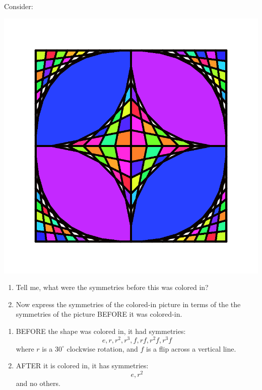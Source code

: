 \documentclass[noauthor,nooutcomes,12pt,hints]{ximera}
\begin{document}
\begin{question}
 Consider:
 \begin{center}
  \includegraphics[width=.6\textwidth]{qR2D4.png}
 \end{center}
 \begin{enumerate}
 \item Tell me, what were the symmetries before this was colored in?
 \item Now express the symmetries of the colored-in picture in terms
    of the the symmetries of the picture BEFORE it was colored-in.
 \end{enumerate}
  \begin{freeResponse}
    \begin{enumerate}
    \item BEFORE the shape was colored in, it had symmetries:
      \[
      e,r,r^2,r^3, f, rf,r^2f,r^3f
      \]
      where $r$ is a $30^\circ$ clockwise rotation, and $f$ is a flip
      across a vertical line.
    \item AFTER it is colored in, it has symmetries:
      \[
      e,r^2
      \]
      and no others.
    \end{enumerate}
  \end{freeResponse}

\end{question}
\mynewpage
\end{document}
